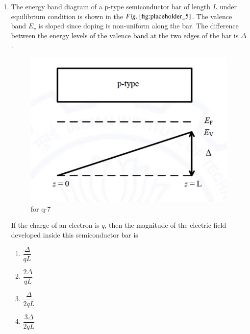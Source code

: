 \documentclass[journal,12pt,onecolumn]{IEEEtran}
\theoremstyle{remark}
\begin{document}
\begin{enumerate}
\item The energy band diagram of a p-type semiconductor bar of length $L$ under equilibrium condition  is shown in the $\figref{fig:placeholder_5}$. The valence band $E_v$ is sloped since doping is non-uniform along the bar. The difference between the energy levels of the valence band at the two edges of the bar is $\Delta$.
\begin{figure}[H]
    \centering
    \includegraphics[width=0.5\columnwidth]{figs/5.png}
    \caption{\centering for q-7}
    \label{fig:placeholder_5}
\end{figure}

If the charge of an electron is $q$, then the magnitude of the electric field developed inside this semiconductor bar is
\begin{multicols}{4}
\begin{enumerate}
\item $\dfrac{\Delta}{qL}$
\item $\dfrac{2\Delta}{qL}$
\item $\dfrac{\Delta}{2qL}$
\item $\dfrac{3\Delta}{2qL}$
\end{enumerate}
\end{multicols}
\hfill {}


\end{enumerate}
\end{document}
